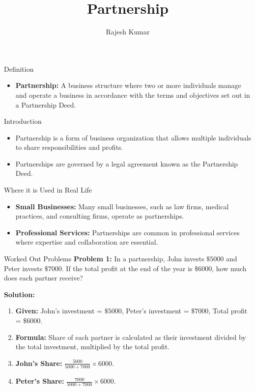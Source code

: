 \title{Partnership}
\author{Rajesh Kumar}
\date{}

\begin{frame}
  \titlepage
\end{frame}

\begin{frame}{Definition}
  \begin{itemize}
    \item \textbf{Partnership:} A business structure where two or more individuals manage and operate a business in accordance with the terms and objectives set out in a Partnership Deed.
  \end{itemize}
\end{frame}

\begin{frame}{Introduction}
  \begin{itemize}
    \item Partnership is a form of business organization that allows multiple individuals to share responsibilities and profits.
    \item Partnerships are governed by a legal agreement known as the Partnership Deed.
  \end{itemize}
\end{frame}

\begin{frame}{Where it is Used in Real Life}
  \begin{itemize}
    \item \textbf{Small Businesses:} Many small businesses, such as law firms, medical practices, and consulting firms, operate as partnerships.
    \item \textbf{Professional Services:} Partnerships are common in professional services where expertise and collaboration are essential.
  \end{itemize}
\end{frame}

\begin{frame}{Worked Out Problems}
  \textbf{Problem 1:} In a partnership, John invests $\$5000$ and Peter invests $\$7000$. If the total profit at the end of the year is $\$6000$, how much does each partner receive?

  \textbf{Solution:}
  \begin{enumerate}
    \item \textbf{Given:} John's investment = $\$5000$, Peter's investment = $\$7000$, Total profit = $\$6000$.
    \item \textbf{Formula:} Share of each partner is calculated as their investment divided by the total investment, multiplied by the total profit.
    \item \textbf{John's Share:} $\frac{5000}{5000 + 7000} \times 6000$.
    \item \textbf{Peter's Share:} $\frac{7000}{5000 + 7000} \times 6000$.
  \end{enumerate}
\end{frame}


